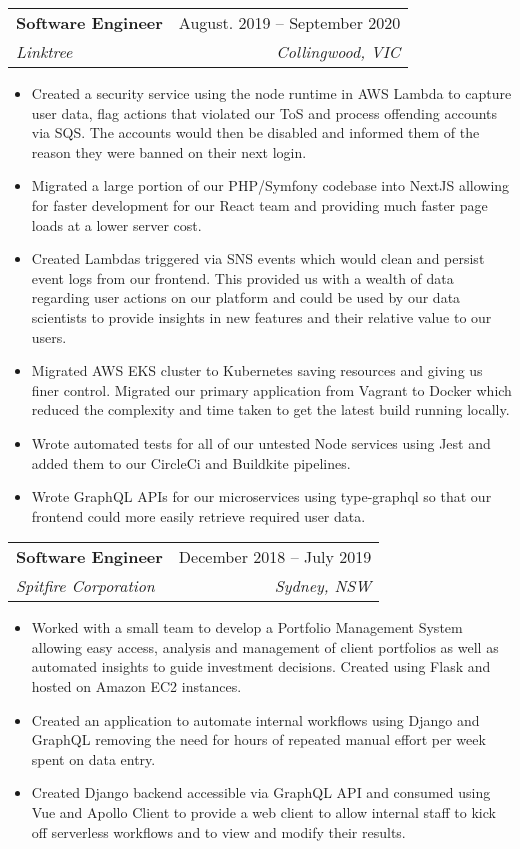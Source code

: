 \documentclass[letterpaper,11pt]{article}
\makeatletter
\newcommand{\resumeItem}[1]{
  \item\small{
    {#1 \vspace{1pt}}
  }
}
\newcommand{\resumeSubheading}[4]{
  \vspace{1pt}\item
    \begin{tabular*}{0.97\textwidth}[t]{l@{\extracolsep{\fill}}r}
      \textbf{#1} & #2 \\
      \textit{\small#3} & \textit{\small #4} \\
    \end{tabular*}\vspace{4pt}
}
\newcommand{\resumeSubSubheading}[2]{
    \item
    \begin{tabular*}{0.97\textwidth}{l@{\extracolsep{\fill}}r}
      \textit{\small#1} & \textit{\small #2} \\
    \end{tabular*}\vspace{4pt}
}
\newcommand{\resumeSubHeadingListEnd}{\end{itemize}}
\newcommand{\resumeItemListStart}{\begin{itemize}}
\newcommand{\resumeItemListEnd}{\end{itemize}\vspace{-5pt}}
\makeatother
\begin{document}

    \resumeSubheading
      {Software Engineer}{August. 2019 -- September 2020}
      {Linktree}{Collingwood, VIC}
      \resumeItemListStart
        \resumeItem{Created a security service using the node runtime in AWS Lambda to capture user data, flag actions that violated our ToS and process offending accounts via SQS. The accounts would then be disabled and informed them of the reason they were banned on their next login.}
        \resumeItem{Migrated a large portion of our PHP/Symfony codebase into NextJS allowing for faster development for our React team and providing much faster page loads at a lower server cost.}
        \resumeItem{Created Lambdas triggered via SNS events which would clean and persist event logs from our frontend. This provided us with a wealth of data regarding user actions on our platform and could be used by our data scientists to provide insights in new features and their relative value to our users.}
        \resumeItem{Migrated AWS EKS cluster to Kubernetes saving resources and giving us finer control. Migrated our primary application from Vagrant to Docker which reduced the complexity and time taken to get the latest build running locally.}
        \resumeItem{Wrote automated tests for all of our untested Node services using Jest and added them to our CircleCi and Buildkite pipelines.}
        \resumeItem{Wrote GraphQL APIs for our microservices using type-graphql so that our frontend could more easily retrieve required user data.}
    \resumeItemListEnd

    \resumeSubheading
      {Software Engineer}{December 2018 -- July 2019}
      {Spitfire Corporation}{Sydney, NSW}
      \resumeItemListStart
        \resumeItem{Worked with a small team to develop a Portfolio Management System allowing easy access, analysis and management of client portfolios as well as automated insights to guide investment decisions. Created using Flask and hosted on Amazon EC2 instances.}
        \resumeItem{Created an application to automate internal workflows using Django and GraphQL removing the need for hours of repeated manual effort per week spent on data entry.}
        \resumeItem{Created Django backend accessible via GraphQL API and consumed using Vue and Apollo Client to provide a web client to allow internal staff to kick off serverless workflows and to view and modify their results.}
      \resumeItemListEnd
      
\end{document}

